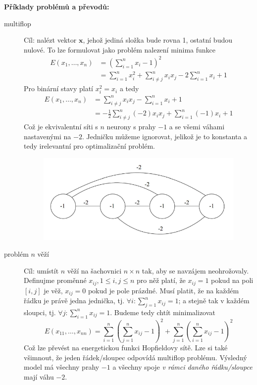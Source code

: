 \documentclass[11pt]{report} %
\renewcommand{\vec}[1]{\mathbf{#1}}
\numberwithin{equation}{section}
\begin{document}
\textbf{Příklady problémů a převodů:}
\begin{description}
	
	
	\item[multiflop] Cíl: nalézt vektor $\vec{x}$, jehož jediná složka bude rovna 1, ostatní budou nulové. To lze formulovat jako problém nalezení minima funkce
	\begin{align*}
		E(x_1, \dots,x_n) &= \left(\sum\limits_{i=1}^{n} x_i - 1\right)^2		\\
		&=\sum\limits_{i=1}^{n} x_i^2 + \sum\limits_{i\neq j}^{n} x_i x_j - 2\sum\limits_{i=1}^{n} x_i + 1
	\end{align*}
	Pro binární stavy platí $x_i^2 = x_i$ a tedy
	\begin{align*}
	E(x_1, \dots,x_n) &= \sum\limits_{i\neq j}^{n} x_i x_j - \sum\limits_{i=1}^{n} x_i + 1\\
	&= -\frac{1}{2}\sum\limits_{i\neq j}^{n} (-2)x_i x_j + \sum\limits_{i=1}^{n} (-1)x_i + 1
	\end{align*}
	Což je ekvivalentní síti s $n$ neurony s prahy $-1$ a se všemi váhami nastavenými na $-2$. Jedničku můžeme ignorovat, jelikož je to konstanta a tedy irelevantní pro optimalizační problém.
	
	\begin{figure}[H]
		\centering
		\includegraphics[scale=0.6]{img/multiflop.pdf}
	\end{figure}

	\item[problém $n$ věží] Cíl: umístít $n$ věží na šachovnici $n\times n$ tak, aby se navzájem neohrožovaly. Definujme proměnné $x_{ij}, 1 \leq i,j \leq n$ pro něž platí, že $x_{ij} = 1$ pokud na poli $[i,j]$ je věž, $x_{ij} = 0$ pokud je pole prázdné. Musí platit, že na každém řádku je právě jedna jednička, tj. $\forall i : \sum_{j=1}^{n} x_{ij} = 1 $; a stejně tak v každém sloupci, tj. $\forall j : \sum_{i=1}^{n} x_{ij} = 1 $. Budeme tedy chtít minimalizovat
	$$E(x_{11}, \dots, x_{nn}) = \sum_{i=1}^{n}\left(\sum_{j=1}^{n} x_{ij} - 1\right)^2 + \sum_{j=1}^{n}\left(\sum_{i=1}^{n} x_{ij} - 1\right)^2$$
	Což lze převést na energetickou funkci Hopfieldovy sítě. Lze si také všimnout, že jeden řádek/sloupec odpovídá multiflop problému. Výsledný model má všechny prahy $-1$ a všechny spoje \textit{v rámci daného řádku/sloupce} mají váhu $-2$.
	

\end{description}
\end{document}
